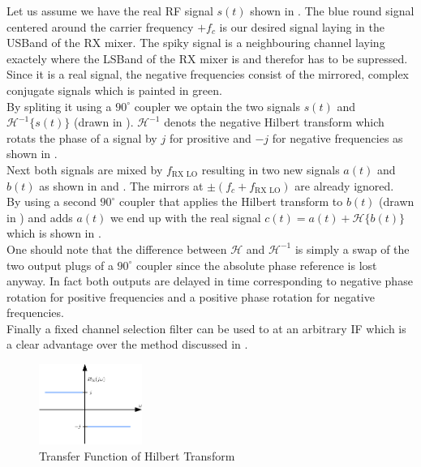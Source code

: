 Let us assume we have the real \gls{RF} signal $s(t)$ shown in
.
The blue round signal centered around the carrier frequency $+f_c$ is our
desired signal laying in the \gls{USBand} of the \gls{RX} mixer.
The spiky signal is a neighbouring channel laying exactely
where the \gls{LSBand} of the \gls{RX} mixer is and therefor has to
be supressed.
Since it is a real signal, the negative frequencies consist of the mirrored,
complex conjugate signals which is painted in green. \\

By spliting it using a $90^\circ$ coupler we optain the two signals
$s(t)$ and $\mathcal{H}^{-1}\{s(t)\}$ (drawn in ).
$\mathcal{H}^{-1}$ denots the negative Hilbert transform which rotats the phase
of a signal by $j$ for prositive and $-j$ for negative frequencies
as shown in . \\

Next both signals are mixed by $f_{\text{RX LO}}$ resulting in two new signals
$a(t)$ and $b(t)$ as shown in  and
.
The mirrors at $\pm (f_c + f_{\text{RX LO}})$ are already ignored. \\

By using a second $90^\circ$ coupler that applies the Hilbert transform
to $b(t)$ (drawn in )
and adds $a(t)$ we end up with the real signal
$c(t) = a(t) + \mathcal{H}\{b(t)\}$
which is shown in . \\

One should note that the difference between $\mathcal{H}$ and $\mathcal{H}^{-1}$
is simply a swap of the two output plugs of a $90^\circ$ coupler since
the absolute phase reference is lost anyway. In fact both outputs are delayed
in time corresponding to negative phase rotation for positive frequencies
and a positive phase rotation for negative frequencies. \\

Finally a fixed channel selection filter can be used to at an arbitrary \gls{IF}
which is a clear advantage over the method discussed in . \\

\begin{figure}[h!]
  \centering
  \includegraphics[width=0.3\textwidth]{figures/hilbert}
  \caption{Transfer Function of Hilbert Transform}
  \label{fig:hilbert}
\end{figure}

